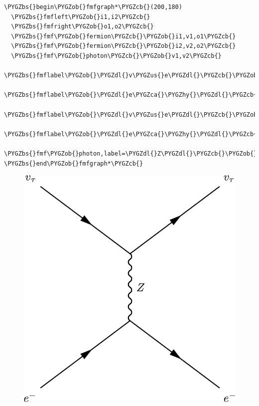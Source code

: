 \documentclass[letterpaper,12pt,english]{sphinxmanual}
\def\PYGZbs{\char`\\}
\def\PYGZus{\char`\_}
\def\PYGZob{\char`\{}
\def\PYGZcb{\char`\}}
\def\PYGZca{\char`\^}
\def\PYGZdl{\char`\$}
\def\PYGZhy{\char`\-}
\begin{document}
\begin{Verbatim}[commandchars=\\\{\}]
\PYGZbs{}begin\PYGZob{}fmfgraph*\PYGZcb{}(200,180)
  \PYGZbs{}fmfleft\PYGZob{}i1,i2\PYGZcb{}
  \PYGZbs{}fmfright\PYGZob{}o1,o2\PYGZcb{}
  \PYGZbs{}fmf\PYGZob{}fermion\PYGZcb{}\PYGZob{}i1,v1,o1\PYGZcb{}
  \PYGZbs{}fmf\PYGZob{}fermion\PYGZcb{}\PYGZob{}i2,v2,o2\PYGZcb{}
  \PYGZbs{}fmf\PYGZob{}photon\PYGZcb{}\PYGZob{}v1,v2\PYGZcb{}
  \PYGZbs{}fmflabel\PYGZob{}\PYGZdl{}v\PYGZus{}e\PYGZdl{}\PYGZcb{}\PYGZob{}i2\PYGZcb{}
  \PYGZbs{}fmflabel\PYGZob{}\PYGZdl{}e\PYGZca{}\PYGZhy{}\PYGZdl{}\PYGZcb{}\PYGZob{}i1\PYGZcb{}
  \PYGZbs{}fmflabel\PYGZob{}\PYGZdl{}v\PYGZus{}e\PYGZdl{}\PYGZcb{}\PYGZob{}o2\PYGZcb{}
  \PYGZbs{}fmflabel\PYGZob{}\PYGZdl{}e\PYGZca{}\PYGZhy{}\PYGZdl{}\PYGZcb{}\PYGZob{}o1\PYGZcb{}
  \PYGZbs{}fmf\PYGZob{}photon,label=\PYGZdl{}Z\PYGZdl{}\PYGZcb{}\PYGZob{}v1,v2\PYGZcb{}
\PYGZbs{}end\PYGZob{}fmfgraph*\PYGZcb{}
\end{Verbatim}
\begin{figure}[htbp]
\centering

\includegraphics{nutaueNeutral.png}
\end{figure}
\end{document}

